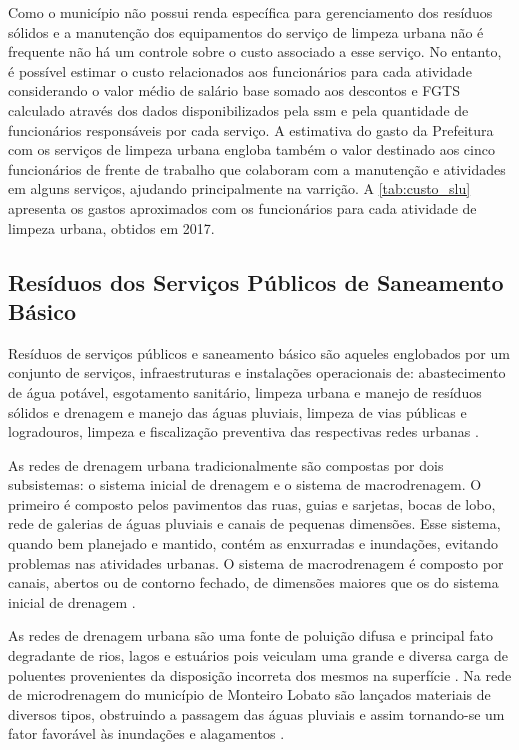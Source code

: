 Como o município não possui renda específica para gerenciamento dos resíduos sólidos e a manutenção dos equipamentos do serviço de limpeza urbana não é frequente não há um controle sobre o custo associado a esse serviço. No entanto, é possível estimar o custo relacionados aos funcionários para cada atividade considerando o valor médio de salário base somado aos descontos e FGTS calculado através dos dados disponibilizados pela \gls{ssm} e pela quantidade de funcionários responsáveis por cada serviço. A estimativa do gasto da Prefeitura com os serviços de limpeza urbana engloba também o valor destinado aos cinco funcionários de frente de trabalho que colaboram com a manutenção e atividades em alguns serviços, ajudando principalmente na varrição.  A \autoref{tab:custo_slu} apresenta os gastos aproximados com os funcionários para cada atividade de limpeza urbana, obtidos em 2017.



\subsection{Resíduos dos Serviços Públicos de Saneamento Básico}

Resíduos de serviços públicos e saneamento básico são aqueles englobados por um conjunto de serviços, infraestruturas e instalações operacionais de: abastecimento de água potável, esgotamento sanitário, limpeza urbana e manejo de resíduos sólidos e drenagem e manejo das águas pluviais, limpeza de vias públicas e logradouros, limpeza e fiscalização preventiva das respectivas redes urbanas \cite{brasil:12305}.  

As redes de drenagem urbana tradicionalmente são compostas por dois subsistemas: o sistema inicial de drenagem e o sistema de macrodrenagem. O primeiro é composto pelos pavimentos das ruas, guias e sarjetas, bocas de lobo, rede de galerias de águas pluviais e canais de pequenas dimensões. Esse sistema, quando bem planejado e mantido, contém as enxurradas e inundações, evitando problemas nas atividades urbanas. O sistema de macrodrenagem é composto por canais, abertos ou de contorno fechado, de dimensões maiores que os do sistema inicial de drenagem \cite{Ramos:1999}.

As redes de drenagem urbana são uma fonte de poluição difusa e principal fato degradante de rios, lagos e estuários pois veiculam uma grande e diversa carga de poluentes provenientes da disposição incorreta dos mesmos na superfície \cite{Brites2004}. Na rede de microdrenagem do município de Monteiro Lobato são lançados materiais de diversos tipos, obstruindo a passagem das águas pluviais e assim tornando-se um fator favorável às inundações e alagamentos \cite{MonteiroLobato}.

